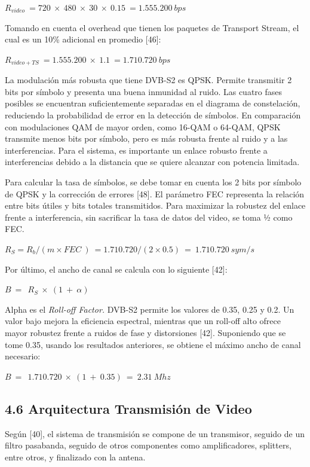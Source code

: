 \documentclass[12pt,a4paper]{article}
\begin{document}
\(R_{video}\  = 720\  \times \ 480\  \times \ 30\  \times \ 0.15\  = 1.555.200\ bps\ \)

Tomando en cuenta el overhead que tienen los paquetes de Transport Stream, el cual es un 10\% adicional en promedio {[}46{]}:

\(R_{video + TS}\  = 1.555.200\  \times \ 1.1\  = 1.710.720\ bps\)

La modulación más robusta que tiene DVB-S2 es QPSK. Permite transmitir 2 bits por símbolo y presenta una buena inmunidad al ruido. Las cuatro fases posibles se encuentran suficientemente separadas en el diagrama de constelación, reduciendo la probabilidad de error en la detección de símbolos. En comparación con modulaciones QAM de mayor orden, como 16-QAM o 64-QAM, QPSK transmite menos bits por símbolo, pero es más robusta frente al ruido y a las interferencias. Para el sistema, es importante un enlace robusto frente a interferencias debido a la distancia que se quiere alcanzar con potencia limitada.

Para calcular la tasa de símbolos, se debe tomar en cuenta los 2 bits por símbolo de QPSK y la corrección de errores {[}48{]}. El parámetro FEC representa la relación entre bits útiles y bits totales transmitidos. Para maximizar la robustez del enlace frente a interferencia, sin sacrificar la tasa de datos del video, se toma ½ como FEC.

\(R_{S} = R_{b}/(m \times FEC\ )\  = 1.710.720/(2 \times 0.5)\  = \ 1.710.720\ sym/s\ \)

Por último, el ancho de canal se calcula con lo siguiente {[}42{]}:

\(B\  = \ \ \)\(R_{S}\  \times \ (1\  + \ \alpha)\)

Alpha es el \emph{Roll-off Factor.} DVB-S2 permite los valores de 0.35, 0.25 y 0.2. Un valor bajo mejora la eficiencia espectral, mientras que un roll-off alto ofrece mayor robustez frente a ruidos de fase y distorsiones {[}42{]}. Suponiendo que se tome 0.35, usando los resultados anteriores, se obtiene el máximo ancho de canal necesario:

\(B\  = \ \ \)\(1.710.720\  \times \ (1\  + \ 0.35)\  = \ 2.31\ Mhz\)

\subsection{4.6 Arquitectura Transmisión de Video}\label{arquitectura-transmisiuxf3n-de-video}

Según {[}40{]}, el sistema de transmisión se compone de un transmisor, seguido de un filtro pasabanda, seguido de otros componentes como amplificadores, splitters, entre otros, y finalizado con la antena.
\end{document}
